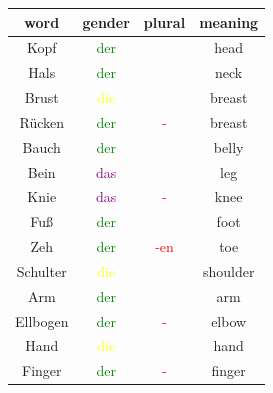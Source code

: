\begin{center}
    \begin{tabular}{|c|c|c|c|}
        \hline
        \rowcolor{gray}
        word     & gender                  & plural               & meaning  \\
        \hline
        Kopf     & \textcolor{green}{der}  &                      & head     \\
        Hals     & \textcolor{green}{der}  &                      & neck     \\
        Brust    & \textcolor{yellow}{die} &                      & breast   \\
        Rücken   & \textcolor{green}{der}  & \textcolor{red}{-}   & breast   \\
        Bauch    & \textcolor{green}{der}  &                      & belly    \\
        Bein     & \textcolor{purple}{das} &                      & leg      \\
        Knie     & \textcolor{purple}{das} & \textcolor{red}{-}   & knee     \\
        Fuß      & \textcolor{green}{der}  &                      & foot     \\
        Zeh      & \textcolor{green}{der}  & \textcolor{red}{-en} & toe      \\
        Schulter & \textcolor{yellow}{die} &                      & shoulder \\
        Arm      & \textcolor{green}{der}  &                      & arm      \\
        Ellbogen & \textcolor{green}{der}  & \textcolor{red}{-}   & elbow    \\
        Hand     & \textcolor{yellow}{die} &                      & hand     \\
        Finger   & \textcolor{green}{der}  & \textcolor{red}{-}   & finger   \\
        \hline
    \end{tabular}
\end{center}

